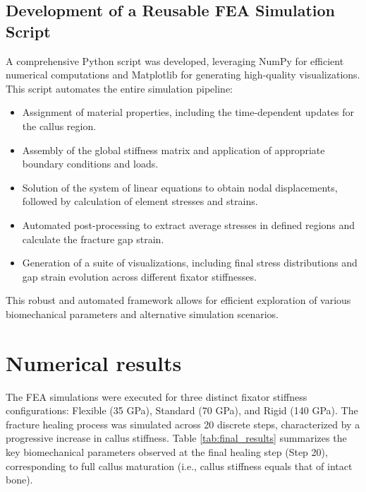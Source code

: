 \documentclass{article}
\begin{document}
\subsection{Development of a Reusable FEA Simulation Script}
A comprehensive Python script was developed, leveraging NumPy for efficient numerical computations and Matplotlib for generating high-quality visualizations. This script automates the entire simulation pipeline:
\begin{itemize}
  \item Assignment of material properties, including the time-dependent updates for the callus region.
  \item Assembly of the global stiffness matrix and application of appropriate boundary conditions and loads.
  \item Solution of the system of linear equations to obtain nodal displacements, followed by calculation of element stresses and strains.
  \item Automated post-processing to extract average stresses in defined regions and calculate the fracture gap strain.
  \item Generation of a suite of visualizations, including final stress distributions and gap strain evolution across different fixator stiffnesses.
\end{itemize}
This robust and automated framework allows for efficient exploration of various biomechanical parameters and alternative simulation scenarios.

\section{Numerical results}

The FEA simulations were executed for three distinct fixator stiffness configurations: Flexible (35 GPa), Standard (70 GPa), and Rigid (140 GPa). The fracture healing process was simulated across 20 discrete steps, characterized by a progressive increase in callus stiffness. Table \ref{tab:final_results} summarizes the key biomechanical parameters observed at the final healing step (Step 20), corresponding to full callus maturation (i.e., callus stiffness equals that of intact bone).
\end{document}
